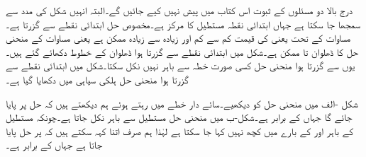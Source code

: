 درج بالا دو مسئلوں کے ثبوت اس کتاب میں پیش نہیں کیے جائیں گے۔البتہ انہیں شکل  کی مدد سے سمجھا جا سکتا ہے جہاں ابتدائی نقطہ  مستطیل  کا مرکز ہے۔مخصوص حل ابتدائی نقطے سے گزرتا ہے۔مساوات  کے تحت  یعنی  کی قیمت کم سے کم  اور زیادہ سے زیادہ  ممکن ہے یعنی مساوات  کے منحنی حل کا ڈھلوان  تا  ممکن ہے۔شکل میں ابتدائی نقطے سے گزرتا ہوا  ڈھلوان کے خطوط دکھائے گئے ہیں۔یوں  سے گزرتا ہوا منحنی حل کسی صورت  خطہ  سے باہر نہیں نکل سکتا۔شکل میں ابتدائی نقطے سے گزرتا ہوا منحنی حل ہلکی سیاہی میں دکھایا گیا ہے۔

شکل -الف میں منحنی حل کو دیکھیے۔سائے دار خطے میں رہتے ہوئے ہم دیکھتے ہیں کہ حل  پر پایا جائے گا جہاں  کے برابر ہے۔شکل-ب میں منحنی حل مستطیل  سے باہر نکل جاتا ہے۔چونکہ مستطیل کے باہر  اور  کے بارے میں کچھ نہیں کہا جا سکتا ہے لہٰذا ہم صرف اتنا کہہ سکتے ہیں کہ  پر حل پایا جاتا ہے جہاں  کے برابر ہے۔

